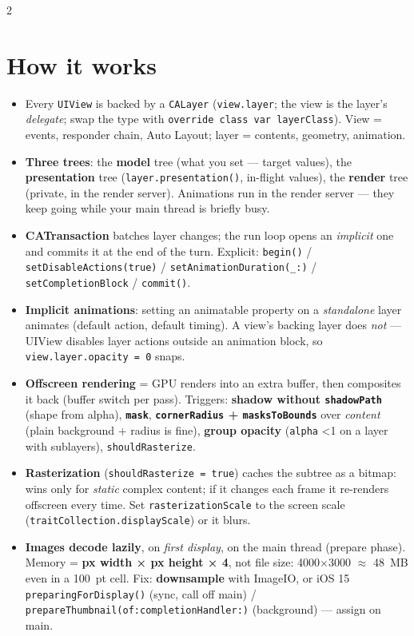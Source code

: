 \documentclass[8pt]{extarticle}
\begin{document}
\begin{multicols}{2}
\raggedright

\section{How it works}
\begin{itemize}
  \item Every \texttt{UIView} is backed by a \texttt{CALayer}
        (\texttt{view.layer}; the view is the layer's \emph{delegate}; swap the
        type with \texttt{override class var layerClass}). View = events,
        responder chain, Auto Layout; layer = contents, geometry, animation.
  \item \textbf{Three trees}: the \textbf{model} tree (what you set — target
        values), the \textbf{presentation} tree (\texttt{layer.presentation()},
        in-flight values), the \textbf{render} tree (private, in the render
        server). Animations run in the render server — they keep going while
        your main thread is briefly busy.
  \item \textbf{CATransaction} batches layer changes; the run loop opens an
        \emph{implicit} one and commits it at the end of the turn. Explicit:
        \texttt{begin()} / \texttt{setDisableActions(true)} /
        \texttt{setAnimationDuration(\_:)} / \texttt{setCompletionBlock} /
        \texttt{commit()}.
  \item \textbf{Implicit animations}: setting an animatable property on a
        \emph{standalone} layer animates (default action, default timing). A
        view's backing layer does \emph{not} — UIView disables layer actions
        outside an animation block, so \texttt{view.layer.opacity = 0} snaps.
  \item \textbf{Offscreen rendering} = GPU renders into an extra buffer, then
        composites it back (buffer switch per pass). Triggers:
        \textbf{shadow without \texttt{shadowPath}} (shape from alpha),
        \textbf{\texttt{mask}}, \textbf{\texttt{cornerRadius} +
        \texttt{masksToBounds}} over \emph{content} (plain background +
        radius is fine), \textbf{group opacity} (\texttt{alpha} \textless 1
        on a layer with sublayers), \texttt{shouldRasterize}.
  \item \textbf{Rasterization} (\texttt{shouldRasterize = true}) caches the
        subtree as a bitmap: wins only for \emph{static} complex content; if it
        changes each frame it re-renders offscreen every time. Set
        \texttt{rasterizationScale} to the screen scale
        (\texttt{traitCollection.displayScale}) or it blurs.
  \item \textbf{Images decode lazily}, on \emph{first display}, on the main
        thread (prepare phase). Memory = \textbf{px width × px height × 4}, not
        file size: 4000×3000 $\approx$ 48~MB even in a 100~pt cell.
        Fix: \textbf{downsample} with ImageIO, or iOS 15
        \texttt{preparingForDisplay()} (sync, call off main) /
        \texttt{prepareThumbnail(of:completionHandler:)} (background) — assign on main.
\end{itemize}


\end{multicols}
\end{document}
